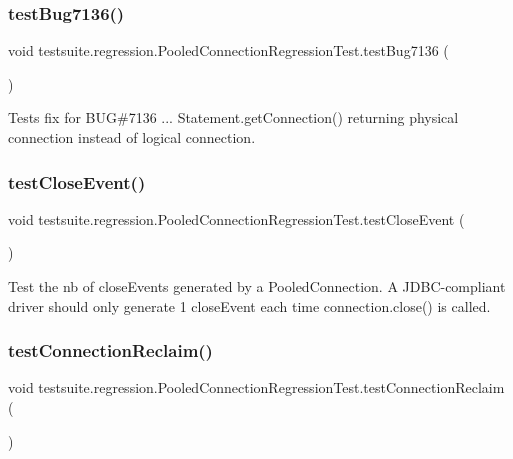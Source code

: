\subsubsection{\texorpdfstring{test\+Bug7136()}{testBug7136()}}
{\footnotesize\ttfamily void testsuite.\+regression.\+Pooled\+Connection\+Regression\+Test.\+test\+Bug7136 (\begin{DoxyParamCaption}{ }\end{DoxyParamCaption})}

Tests fix for B\+UG\#7136 ... Statement.\+get\+Connection() returning physical connection instead of logical connection. \mbox{\label{classtestsuite_1_1regression_1_1_pooled_connection_regression_test_a271d5adc3f09f3483472dc3c7bb7f24b}} 
\subsubsection{\texorpdfstring{test\+Close\+Event()}{testCloseEvent()}}
{\footnotesize\ttfamily void testsuite.\+regression.\+Pooled\+Connection\+Regression\+Test.\+test\+Close\+Event (\begin{DoxyParamCaption}{ }\end{DoxyParamCaption})}

Test the nb of close\+Events generated by a Pooled\+Connection. A J\+D\+B\+C-\/compliant driver should only generate 1 close\+Event each time connection.\+close() is called. \mbox{\label{classtestsuite_1_1regression_1_1_pooled_connection_regression_test_a1f5f8fe8cb25dbed85e0f3861c971e2f}} 
\subsubsection{\texorpdfstring{test\+Connection\+Reclaim()}{testConnectionReclaim()}}
{\footnotesize\ttfamily void testsuite.\+regression.\+Pooled\+Connection\+Regression\+Test.\+test\+Connection\+Reclaim (\begin{DoxyParamCaption}{ }\end{DoxyParamCaption})}

